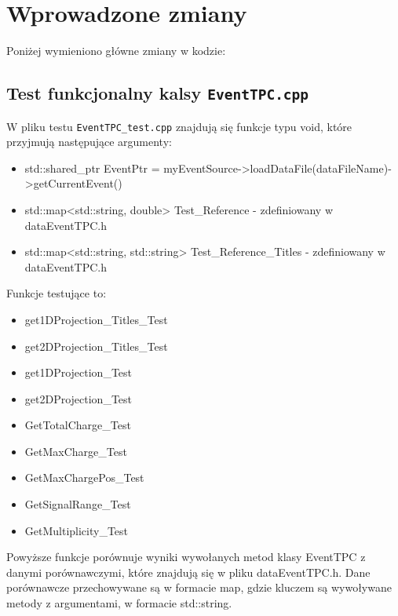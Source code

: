 \documentclass{article}
\begin{document}
\section{Wprowadzone zmiany}
Poniżej wymieniono główne zmiany w kodzie:
\subsection{Test funkcjonalny kalsy \texttt{EventTPC.cpp}}
W pliku testu \texttt{EventTPC\_test.cpp} znajdują się funkcje typu void, które przyjmują następujące argumenty:
\begin{itemize}
    \item
  std::shared\_ptr EventPtr =
  myEventSource-\textgreater loadDataFile(dataFileName)-\textgreater getCurrentEvent()
    \item
  std::map\textless std::string, double\textgreater{} Test\_Reference -
  zdefiniowany w dataEventTPC.h
    \item
  std::map\textless std::string, std::string\textgreater{}
  Test\_Reference\_Titles - zdefiniowany w dataEventTPC.h
    
\end{itemize}
Funkcje testujące to:
\begin{itemize}
    \item get1DProjection\_Titles\_Test 
    \item get2DProjection\_Titles\_Test
    \item get1DProjection\_Test 
    \item get2DProjection\_Test 
    \item GetTotalCharge\_Test 
    \item GetMaxCharge\_Test 
    \item GetMaxChargePos\_Test 
    \item GetSignalRange\_Test 
    \item GetMultiplicity\_Test
\end{itemize}
Powyższe funkcje porównuje wyniki wywołanych metod klasy EventTPC z danymi porównawczymi, które znajdują się w pliku dataEventTPC.h. Dane porównawcze przechowywane są w formacie map, gdzie kluczem są wywoływane metody z argumentami, w formacie std::string.
\end{document}
